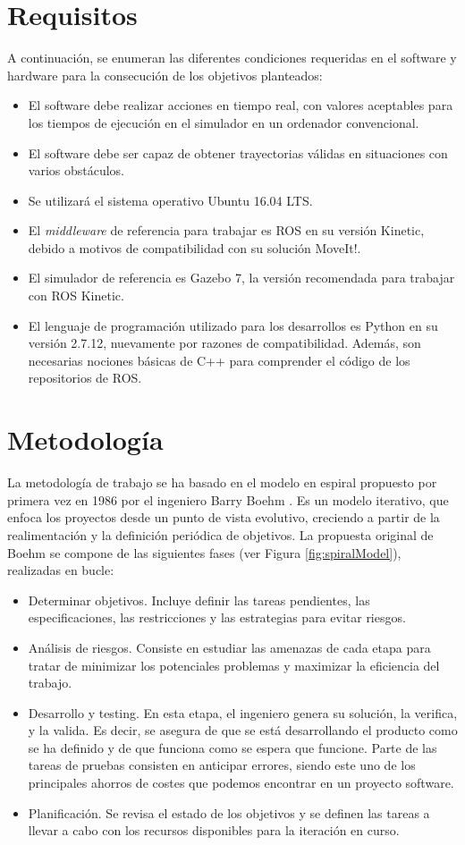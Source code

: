\documentclass[12pt,spanish,chapterprefix, numbers=noenddot]{book}
\numberwithin{equation}{section}
\numberwithin{figure}{section}
\begin{document}
\section{Requisitos}
A continuación, se enumeran las diferentes condiciones requeridas en el software y hardware para la consecución de los objetivos planteados: 
\begin{itemize}
    \item El software debe realizar acciones en tiempo real, con valores aceptables para los tiempos de ejecución en el simulador en un ordenador convencional.
    \item El software debe ser capaz de obtener trayectorias válidas en situaciones con varios obstáculos.
    \item Se utilizará el sistema operativo Ubuntu 16.04 LTS.
    \item El \textit{middleware} de referencia para trabajar es ROS en su versión Kinetic, debido a motivos de compatibilidad con su solución MoveIt!.
    \item El simulador de referencia es Gazebo 7, la versión recomendada para trabajar con ROS Kinetic. 
    \item El lenguaje de programación utilizado para los desarrollos es Python en su versión 2.7.12, nuevamente por razones de compatibilidad. Además, son necesarias nociones básicas de C++ para comprender el código de los repositorios de ROS. 
\end{itemize}

\section{Metodología}
La metodología de trabajo se ha basado en el modelo en espiral propuesto por primera vez en 1986 por el ingeniero Barry Boehm \cite{boehm}. Es un modelo iterativo, que enfoca los proyectos desde un punto de vista evolutivo, creciendo a partir de la realimentación y la definición periódica de objetivos. 
La propuesta original de Boehm se compone de las siguientes fases (ver Figura \ref{fig:spiralModel}), realizadas en bucle: 
\begin{itemize}
    \item Determinar objetivos. Incluye definir las tareas pendientes, las especificaciones, las restricciones y las estrategias para evitar riesgos.
    \item Análisis de riesgos. Consiste en estudiar las amenazas de cada etapa para tratar de minimizar los potenciales problemas y maximizar la eficiencia del trabajo. 
    \item Desarrollo y testing. En esta etapa, el ingeniero genera su solución, la verifica, y la valida. Es decir, se asegura de que se está desarrollando el producto como se ha definido y de que funciona como se espera que funcione. Parte de las tareas de pruebas consisten en anticipar errores, siendo este uno de los principales ahorros de costes \cite{ibm_costs} \cite{inc_costs} que podemos encontrar en un proyecto software. 
    \item Planificación. Se revisa el estado de los objetivos y se definen las tareas a llevar a cabo con los recursos disponibles para la iteración en curso.  
\end{itemize}
\end{document}
